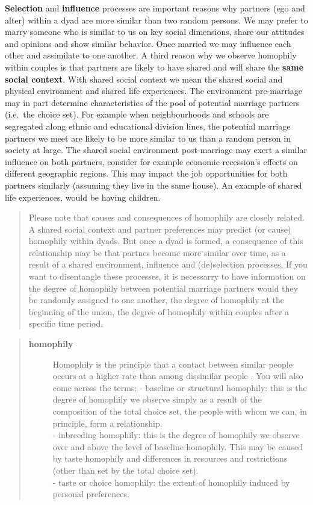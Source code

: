 \documentclass[
]{book}
\begin{document}
\textbf{Selection} and \textbf{influence} processes are important reasons why partners (ego and alter) within a dyad are more similar than two random persons. We may prefer to marry someone who is similar to us on key social dimensions, share our attitudes and opinions and show similar behavior. Once married we may influence each other and assimilate to one another. A third reason why we observe homophily within couples is that partners are likely to have shared and will share the \textbf{same social context}. With shared social context we mean the shared social and physical environment and shared life experiences. The environment pre-marriage may in part determine characteristics of the pool of potential marriage partners (i.e.~the choice set). For example when neighbourhoods and schools are segregated along ethnic and educational division lines, the potential marriage partners we meet are likely to be more similar to us than a random person in society at large. The shared social environment post-marriage may exert a similar influence on both partners, consider for example economic recession's effects on different geographic regions. This may impact the job opportunities for both partners similarly (assuming they live in the same house). An example of shared life experiences, would be having children.

\begin{quote}
Please note that causes and consequences of homophily are closely related. A shared social context and partner preferences may predict (or cause) homophily within dyads. But once a dyad is formed, a consequence of this relationship may be that partnes become more similar over time, as a result of a shared environment, influence and (de)selection processes. If you want to disentangle these processes, it is necessarry to have information on the degree of homophily between potential marriage partners would they be randomly assigned to one another, the degree of homophily at the beginning of the union, the degree of homophily within couples after a specific time period.
\end{quote}

\begin{quote}
\begin{description}
\item[\textbf{homophily}]
Homophily is the principle that a contact between similar people occurs at a
higher rate than among dissimilar people \citep{mcpherson2001}.
You will also come across the terms:
- baseline or structural homophily: this is the degree of homophily we observe simply as a result of the composition of the total choice set, the people with whom we can, in principle, form a relationship.\\
- inbreeding homophily: this is the degree of homophily we observe over and above the level of baseline homophily. This may be caused by taste homophily and differences in resources and restrictions (other than set by the total choice set).\\
- taste or choice homophily: the extent of homophily induced by personal preferences.\\
\end{description}
\end{quote}
\end{document}
